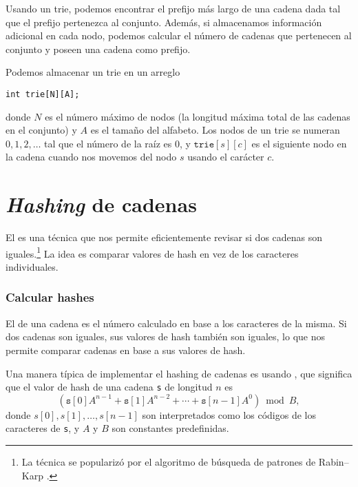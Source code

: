 Usando un trie, podemos encontrar el prefijo más largo de una cadena dada
tal que el prefijo pertenezca al conjunto. Además, si almacenamos
información adicional en cada nodo, podemos calcular el número de cadenas
que pertenecen al conjunto y poseen una cadena como prefijo.

\pagebreak \noindent
Podemos almacenar un trie en un arreglo
\begin{lstlisting}
int trie[N][A];
\end{lstlisting}
donde $N$ es el número máximo de nodos (la longitud máxima total
de las cadenas en el conjunto) y $A$ es el tamaño del alfabeto.
Los nodos de un trie se numeran $0,1,2,\ldots$ tal que el número de la
raíz es 0, y $\texttt{trie}[s][c]$ es el siguiente nodo en la cadena
cuando nos movemos del nodo $s$ usando el carácter $c$.

\section{\textit{Hashing} de cadenas}


El  es una técnica que nos permite
eficientemente revisar si dos cadenas son iguales.\footnote{La técnica se
    popularizó por el algoritmo de búsqueda de patrones de
    Rabin--Karp \cite{kar87}.}
La idea es comparar valores de hash en vez de los caracteres individuales.

\subsubsection*{Calcular hashes}


El  de una cadena es el número calculado en base a
los caracteres de la misma. Si dos cadenas son iguales, sus valores de
hash también son iguales, lo que nos permite comparar cadenas en base
a sus valores de hash.

Una manera típica de implementar el hashing de cadenas es usando
, que significa que el valor de hash de una cadena
\texttt{s} de longitud $n$ es
\[(\texttt{s}[0] A^{n-1} + \texttt{s}[1] A^{n-2} + \cdots + \texttt{s}[n-1] A^0) \bmod B  ,\]
donde $s[0],s[1],\ldots,s[n-1]$ son interpretados como los códigos de
los caracteres de \texttt{s}, y $A$ y $B$ son constantes predefinidas.


